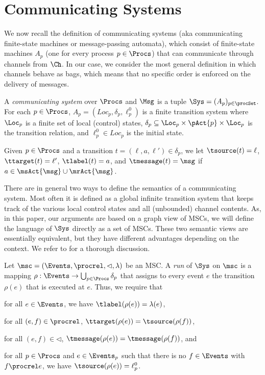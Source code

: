 

\section{Communicating Systems}

We now recall the definition of communicating systems (aka communicating finite-state
machines or message-passing automata), which consist of finite-state machines $A_p$
(one for every process $p \in \Procs$) that can communicate through channels from $\Ch$. In our case, we consider the most general definition in which channels behave as bags, which means that no specific order is enforced on the delivery of messages.

\begin{definition}\label{def:cs}
A \emph{communicating system} over $\Procs$ and $\Msg$ is a tuple
   $ \Sys = (A_p)_{p\in\procSet}$. For each
   $p \in \Procs$, $A_p = (Loc_p, \delta_p, \ell^0_p)$ is a finite transition system where
   $\Loc_p$ is a finite set of local (control) states, $\delta_p
   \subseteq \Loc_p \times \pAct{p} \times \Loc_p$ is the
   transition relation, and $\ell^0_p \in Loc_p$ is the initial state.
\end{definition}

Given $p \in \Procs$ and a transition $t = (\ell,a,\ell') \in \delta_p$, we let
$\tsource(t) = \ell$, $\ttarget(t) = \ell'$, $\tlabel(t) = a$, and
$\tmessage(t) = \msg$ if $a \in \msAct{\msg} \cup \mrAct{\msg}$.

\smallskip

There are in general two ways to define the semantics of a communicating system.
Most often it is defined as a global infinite transition system that keeps track
of the various local control states and all (unbounded) channel contents.
As, in this paper, our arguments are based on a graph view of MSCs, we will define
the language of $\Sys$ directly as a set of MSCs. These two semantic views are essentially
equivalent, but they have different advantages depending on the context.
We refer to \cite{CyriacG14} for a thorough discussion.

Let $\msc = (\Events,\procrel,\lhd,\lambda)$ be an MSC.
A \emph{run} of $\Sys$ on $\msc$ is a mapping
$\rho: \Events \to \bigcup_{p \in \Procs} \delta_p$
that assigns to every event $e$ the transition $\rho(e)$
that is executed at $e$. Thus, we require that
\begin{enumerate*}[label={(\roman*)}]
\item for all $e \in \Events$, we have $\tlabel(\rho(e)) = \lambda(e)$,
\item for all $(e,f) \in {\procrel}$, $\ttarget(\rho(e)) = \tsource(\rho(f))$,
\item for all $(e,f) \in {\lhd}$, $\tmessage(\rho(e)) = \tmessage(\rho(f))$,
and
\item for all $p \in \Procs$ and $e \in \Events_p$ such that there is no $f \in \Events$ with $f \procrel e$, we have $\tsource(\rho(e)) = \ell_p^0$.
\end{enumerate*}

